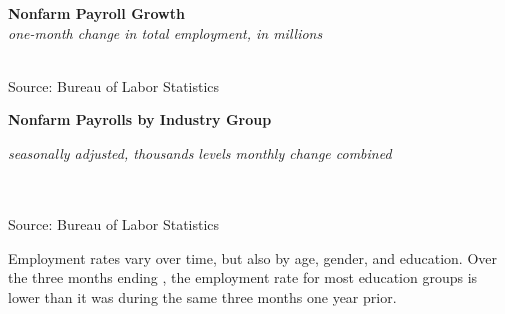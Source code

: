 \documentclass{report}
\newcommand{\tbllink}[1]{\href{https://raw.githubusercontent.com/bdecon/US-chartbook/master/chartbook/data/#1}{\faTable}}
\newcommand{\ctsbar}[5]{
		\addplot[ybar stacked, bar width=#5, draw opacity=0, fill=#1] 
			table [x=#2, y=#3, col sep=comma]{#4};}
\newcommand{\dateaxisticks}{
		date coordinates in=x, axis line style={draw=none},
		xmax={2021-05-15},
		max space between ticks=40,	    
		xtick={{1990-01-01}, {1992-01-01}, {1994-01-01}, 
			{1996-01-01}, {1998-01-01}, {2000-01-01}, 
			{2002-01-01}, {2004-01-01}, {2006-01-01},
			{2008-01-01}, {2010-01-01}, {2012-01-01}, {2014-01-01},
		    {2016-01-01}, {2018-01-01}, {2020-01-01}},
		minor xtick={{1989-01-01}, {1991-01-01}, {1993-01-01},
			{1995-01-01}, {1997-01-01}, {1999-01-01}, 
			{2001-01-01}, {2003-01-01}, {2005-01-01}, {2007-01-01},
		    {2009-01-01}, {2011-01-01}, {2013-01-01}, {2015-01-01},
		    {2017-01-01}, {2019-01-01}, {2021-01-01}},
		enlarge y limits={0.06}, enlarge x limits={0.01},
		}
\newcommand{\bbar}[2]{extra #1 ticks = {{#2}}, extra #1 tick labels = ,
		extra #1 tick style = {grid=major, grid style={thick, black!25}},}
\begin{document}
{\begin{minipage}{0.28\textwidth}

\end{minipage} \hspace{6mm}
\begin{minipage}{0.43\textwidth}
\normalsize \textbf{Nonfarm Payroll Growth}\\
\footnotesize{\textit{one-month change in total employment, in millions}}\\
\hspace*{-3mm} \\
\footnotesize{Source: Bureau of Labor Statistics} \hfill \tbllink{nfp.csv}
\end{minipage}
\vspace{3mm}

\normalsize \textbf{Nonfarm Payrolls by Industry Group}\\
\footnotesize{\textit{seasonally adjusted, thousands \hspace{9mm}levels \hspace{17mm} monthly change \hspace{29mm} combined}\\
\vspace{-5mm}

\hspace*{-3mm} \noindent {} \setlength{\tabcolsep}{3.1pt} \color{black!90}
		{\renewcommand{\arraystretch}{1.55}
		 \begin{tabular}{p{38mm} R{12mm} R{12mm} | R{9.5mm} R{9.5mm} R{9.5mm} 
		   R{10mm} | R{11mm} R{11mm}}
			  \hline
		\end{tabular}
		}	\\
		
\vspace{-2mm}
\footnotesize{Source: Bureau of Labor Statistics} \hspace{9.7cm} \tbllink{ces_data.csv}

\newpage
\begin{minipage}{0.76\textwidth} 
\small Employment rates vary over time, but also by age, gender, and education. Over the three months ending \unskip, the employment rate for most education groups is lower than it was during the same three months one year prior.
\vspace{2mm}


\end{minipage}}}
\end{document}
